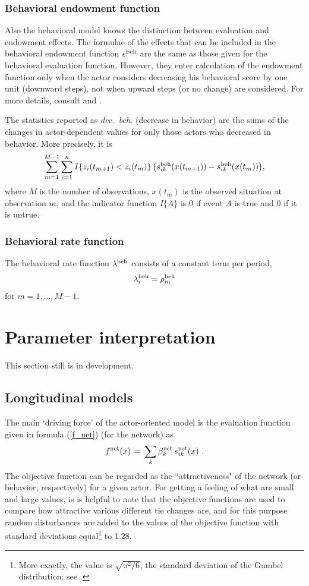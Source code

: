 \documentclass[a4paper,fleqn]{article}
\newcommand{\+}{\, + \,}
\begin{document}
{\subsubsection{Behavioral endowment function}
Also the behavioral model knows the distinction between evaluation and
endowment effects. The formulae of the effects that can be included
in the behavioral endowment function $e^{\rm beh}$ are the same as
those given for the behavioral evaluation function. However, they enter
calculation of the endowment function only when the actor considers
decreasing his behavioral score by one unit (downward steps), not
when upward steps (or no change) are considered. For more details,
consult
\citet*{SnijdersEA07} and
\citet*{SteglichEA10}.

The statistics reported as \emph{dec.\ beh.} (decrease in behavior)
are the sums of the changes in actor-dependent values
for only those actors who decreased in behavior.
More precisely, it is
\begin{equation}
\sum_{m=1}^{M-1} \sum_{i=1}^n I\{z_{i}(t_{m+1}) < z_{i}(t_m) \}\,
     \big( s^{\rm beh}_{ik}(x(t_{m+1})) -  s^{\rm beh}_{ik}(x(t_m))   \big) ,
\end{equation}
where $M$ is the number of observations, $x(t_m)$ is the observed situation
at observation $m$, and the indicator function $I\{A\}$ is 0 if event $A$ is true
and 0 if it is untrue.

\subsubsection{Behavioral rate function}
The behavioral rate function $\lambda^{\rm beh}$ consists of a
constant term per period, \[ \lambda^{\rm beh}_{i} = \rho^{\rm
beh}_m \] for $m = 1, ..., M-1$.




\newpage
\section{Parameter interpretation}
\label{S_interpret}

This section still is in development.

\subsection{Longitudinal models}

The main `driving force' of the actor-oriented model
is the evaluation function
\citep[in earlier publications called objective function,
see][]{Snijders01, Snijders05} given in formula (\ref{f_net})
(for the network) as
\[
f^{\rm net}(x) \, = \, \sum_k \beta^{\rm net}_k \, s^{\rm net}_{ik}(x)   \ .
\]
The objective function can be regarded as the ``attractiveness"
of the network (or behavior, respectively) for a given actor.
For getting a feeling of what are small and large values,
is is helpful to note that the objective functions are
used to compare how attractive various different tie changes are,
and for this purpose random disturbances are added
to the values of the objective function with standard deviations
equal\footnote{More exactly, the value is $\sqrt{\pi^2/6}$,
the standard deviation of the Gumbel
distribution; see \citet{Snijders01}.} to 1.28.

}
\end{document}
